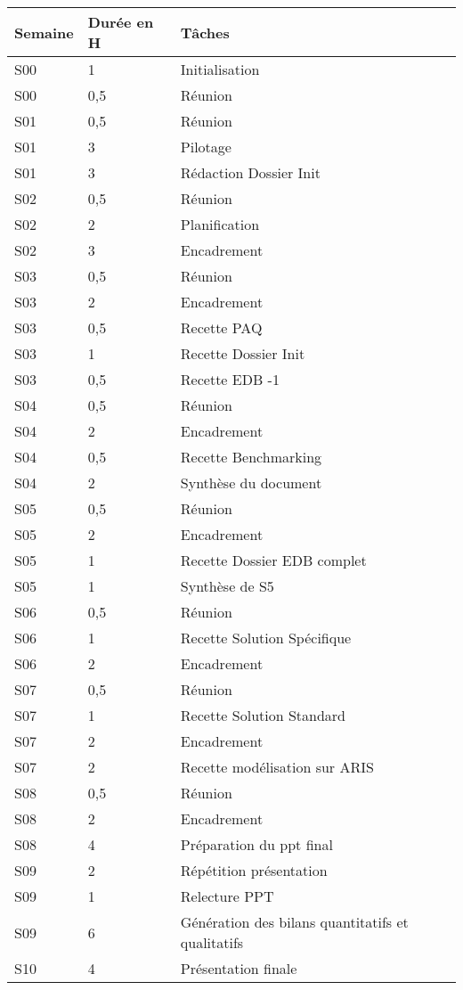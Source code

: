 \begin{tabular}{|l|l|l|}
\hline
Semaine&Durée en H&Tâches\\
\hline
S00&1&Initialisation\\
\hline
S00&0,5&Réunion\\
\hline
S01&0,5&Réunion\\
\hline
S01&3&Pilotage\\
\hline
S01&3&Rédaction Dossier Init\\
\hline
S02&0,5&Réunion\\
\hline
S02&2&Planification\\
\hline
S02&3&Encadrement\\
\hline
S03&0,5&Réunion\\
\hline
S03&2&Encadrement\\
\hline
S03&0,5&Recette PAQ\\
\hline
S03&1&Recette Dossier Init\\
\hline
S03&0,5&Recette EDB -1\\
\hline
S04&0,5&Réunion\\
\hline
S04&2&Encadrement\\
\hline
S04&0,5&Recette Benchmarking\\
\hline
S04&2&Synthèse du document\\
\hline
S05&0,5&Réunion\\
\hline
S05&2&Encadrement\\
\hline
S05&1&Recette Dossier EDB complet\\
\hline
S05&1&Synthèse de S5\\
\hline
S06&0,5&Réunion\\
\hline
S06&1&Recette Solution Spécifique\\
\hline
S06&2&Encadrement\\
\hline
S07&0,5&Réunion\\
\hline
S07&1&Recette Solution Standard\\
\hline
S07&2&Encadrement\\
\hline
S07&2&Recette modélisation sur ARIS\\
\hline
S08&0,5&Réunion\\
\hline
S08&2&Encadrement\\
\hline
S08&4&Préparation du ppt final\\
\hline
S09&2&Répétition présentation\\
\hline
S09&1&Relecture PPT\\
\hline
S09&6&Génération des bilans quantitatifs et qualitatifs\\
\hline
S10&4&Présentation finale\\
\hline
\end{tabular}

